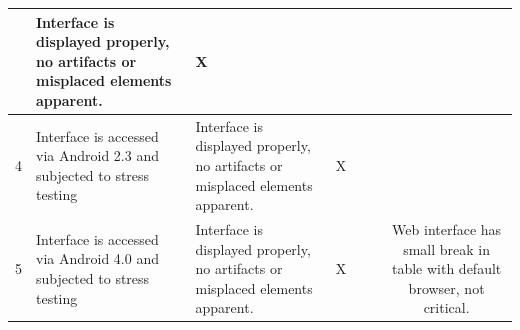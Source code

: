 \documentclass[11pt]{article} %
\begin{document}
\begin{table}[h!]
\begin{tabular}{|c|p{3.5cm}|p{5.5cm}|c|c|c|c|c|}
  & Interface is displayed properly, no artifacts or misplaced \newline elements apparent.
  & X & & &\multicolumn{2}{|c|}{}\\
\hline
4 & Interface is accessed via Android 2.3 and subjected to stress \newline testing 
  & Interface is displayed properly, no artifacts or misplaced \newline elements apparent. 
  & X & & &\multicolumn{2}{|c|}{}\\
\hline
5 & Interface is accessed via Android 4.0 and subjected to stress \newline testing 
  & Interface is displayed properly, no artifacts or misplaced \newline elements apparent.
  & X & & &\multicolumn{2}{|p{3cm}|}{Web interface has small break \newline in table with \newline default browser, \newline not critical.}\\
\hline
\end{tabular}
\end{table}
\clearpage
\end{document}
